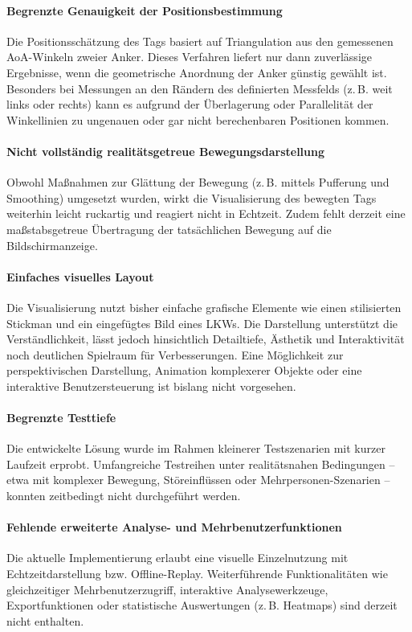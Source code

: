 \documentclass[a4paper, 12pt]{article} %
\begin{document}
\paragraph{Begrenzte Genauigkeit der Positionsbestimmung} 
Die Positionsschätzung des Tags basiert auf Triangulation aus den gemessenen \ac{AoA}-Winkeln zweier Anker. Dieses Verfahren liefert nur dann 
zuverlässige Ergebnisse, wenn die geometrische Anordnung der Anker günstig gewählt ist. Besonders bei Messungen an den Rändern des definierten 
Messfelds (z.\,B. weit links oder rechts) kann es aufgrund der Überlagerung oder Parallelität der Winkellinien zu ungenauen oder gar nicht 
berechenbaren Positionen kommen.

\paragraph{Nicht vollständig realitätsgetreue Bewegungsdarstellung}
Obwohl Maßnahmen zur Glättung der Bewegung (z.\,B. mittels Pufferung und Smoothing) umgesetzt wurden, wirkt die Visualisierung des bewegten 
Tags weiterhin leicht ruckartig und reagiert nicht in Echtzeit. Zudem fehlt derzeit eine maßstabsgetreue Übertragung der tatsächlichen Bewegung 
auf die Bildschirmanzeige.

\paragraph{Einfaches visuelles Layout}
Die Visualisierung nutzt bisher einfache grafische Elemente wie einen stilisierten Stickman und ein eingefügtes Bild eines \ac{LKW}s. 
Die Darstellung unterstützt die Verständlichkeit, lässt jedoch hinsichtlich Detailtiefe, Ästhetik und Interaktivität noch deutlichen Spielraum 
für Verbesserungen. Eine Möglichkeit zur perspektivischen Darstellung, Animation komplexerer Objekte oder eine interaktive Benutzersteuerung ist 
bislang nicht vorgesehen.

\paragraph{Begrenzte Testtiefe}
Die entwickelte Lösung wurde im Rahmen kleinerer Testszenarien mit kurzer Laufzeit erprobt. Umfangreiche Testreihen unter realitätsnahen 
Bedingungen – etwa mit komplexer Bewegung, Störeinflüssen oder Mehrpersonen-Szenarien – konnten zeitbedingt nicht durchgeführt werden.

\paragraph{Fehlende erweiterte Analyse- und Mehrbenutzerfunktionen}
Die aktuelle Implementierung erlaubt eine visuelle Einzelnutzung mit Echtzeitdarstellung bzw. Offline-Replay. Weiterführende Funktionalitäten wie 
gleichzeitiger Mehrbenutzerzugriff, interaktive Analysewerkzeuge, Exportfunktionen oder statistische Auswertungen (z.\,B. Heatmaps) sind derzeit nicht 
enthalten.
\end{document}
